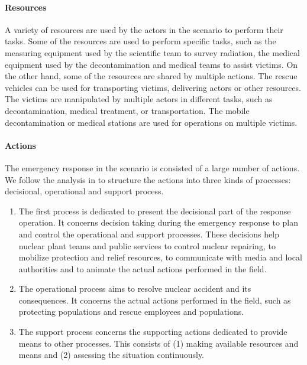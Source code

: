 \paragraph*{Resources} %
\label{par:resources}
A variety of resources are used by the actors in the scenario to perform their tasks. Some of the resources are used to perform specific tasks, such as the measuring equipment used by the scientific team to survey radiation, the medical equipment used by the decontamination and medical teams to assist victims. On the other hand, some of the resources are shared by multiple actions. The rescue vehicles can be used for transporting victims, delivering actors or other resources. The victims are manipulated by multiple actors in different tasks, such as decontamination, medical treatment, or transportation. The mobile decontamination or medical stations are used for operations on multiple victims. 

\paragraph*{Actions} %
\label{par:actions}
The emergency response in the scenario is consisted of a large number of actions. We follow the analysis in \cite{Truptil2012} to structure the actions into three kinds of processes: decisional, operational and support process.

\begin{enumerate}
	\item The first process is dedicated to present the decisional part of the response operation. It concerns decision taking during the emergency response to plan and control the operational and support processes. These decisions help nuclear plant teams and public services to control nuclear repairing, to mobilize protection and relief resources, to communicate with media and local authorities and to animate the actual actions performed in the field.
	\item The operational process aims to resolve nuclear accident and its consequences. It concerns the actual actions performed in the field, such as protecting populations and rescue employees and populations. 
	\item The support process concerns the supporting actions dedicated to provide means to other processes. This consists of (1) making available resources and means and (2) assessing the situation continuously.
\end{enumerate}

